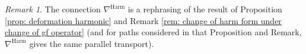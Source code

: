 \documentclass[11pt,a4paper]{amsart}
\theoremstyle{plain} %
\theoremstyle{definition}
\theoremstyle{remark}
\newtheorem{rem}[thm]{Remark}
\newcommand{\mr}{\mathrm}
\newcommand{\ra}{\rightarrow}
\begin{document}
{%

\begin{rem}\label{rem 3.9}
The connection $\nabla^\mr{Harm}$ is a rephrasing of the result of Proposition \ref{prop: deformation harmonic} and Remark \ref{rem: change of harm form under change of gf operator} (and for paths considered in that Proposition and Remark, $\nabla^\mr{Harm}$ gives the same parallel transport).
\end{rem}
}
\end{document}
